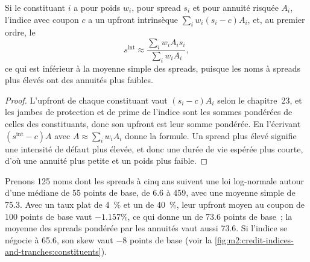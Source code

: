 \begin{proposition}\label{prop:m2:credit-indices-and-tranches:intrinsic}
Si le constituant $i$ a pour poids $w_i$, pour spread $s_i$ et pour annuité risquée $A_i$, l'indice
avec coupon $c$ a un upfront intrinsèque $\sum_i w_i (s_i - c) A_i$, et, au premier
ordre, le 
\[
s^{\text{int}} \approx \frac{\sum_i w_i A_i s_i}{\sum_i w_i A_i},
\]
ce qui est inférieur à la moyenne simple des spreads, puisque les noms à spreads plus élevés ont
des annuités plus faibles.
\end{proposition}

\begin{proof}
L'upfront de chaque constituant vaut $(s_i - c)A_i$ selon le chapitre~23, et les jambes de
protection et de prime de l'indice sont les sommes pondérées de celles des constituants, donc son
upfront est leur somme pondérée. En l'écrivant $(s^{\text{int}} - c)A$ avec $A \approx
\sum_i w_i A_i$ donne la formule. Un spread plus élevé signifie une intensité de défaut plus élevée, et donc
une durée de vie espérée plus courte, d'où une annuité plus petite et un poids plus faible.
\end{proof}

\begin{example}\label{ex:m2:credit-indices-and-tranches:intrinsic}
Prenons 125 noms dont les spreads à cinq ans suivent une loi log-normale autour d'une médiane de 55
points de base, de 6.6 à 459, avec une moyenne simple de 75.3. Avec un taux plat de 4~\%
et un  de 40~\%, leur upfront moyen au coupon de 100 points de base vaut
$-1.157\%$, ce qui donne un  de 73.6 points de base~; la
moyenne des spreads pondérée par les annuités vaut aussi 73.6. Si l'indice se négocie à 65.6, son
skew vaut $-8$ points de base (voir la \cref{fig:m2:credit-indices-and-tranches:constituents}).
\end{example}

